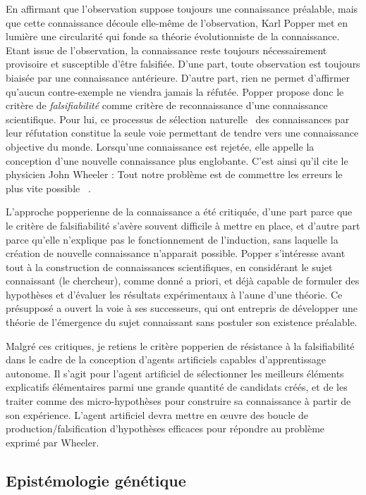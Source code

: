 \noindent
En affirmant que l'observation suppose toujours une connaissance préalable, mais que cette connaissance découle elle-même de l'observation, Karl Popper met en lumière une circularité qui fonde sa théorie évolutionniste de la connaissance. 
Etant issue de l’observation, la connaissance reste toujours nécessairement provisoire et susceptible d'être falsifiée. 
D'une part, toute observation est toujours biaisée par une connaissance antérieure. 
D'autre part, rien ne permet d’affirmer qu'aucun contre-exemple ne viendra jamais la réfutée. 
Popper propose donc le critère de \emph{falsifiabilité} comme critère de reconnaissance d'une connaissance scientifique. 
Pour lui, ce processus de \og sélection naturelle \fg\ des connaissances par leur réfutation constitue la seule voie permettant de tendre vers une connaissance objective du monde. 
Lorsqu'une connaissance est rejetée, elle appelle la conception d’une nouvelle connaissance plus englobante. 
C’est ainsi qu’il cite le physicien John Wheeler : \og Tout notre problème est de commettre les erreurs le plus vite possible \fg\ \cite{popper_connaissance_1979}.

L'approche popperienne de la connaissance a été critiquée, d'une part parce que le critère de falsifiabilité s'avère souvent difficile à mettre en place, et d'autre part parce qu'elle n'explique pas le fonctionnement de l'induction, sans laquelle la création de nouvelle connaissance n'apparait possible.
Popper s'intéresse avant tout à la construction de connaissances scientifiques, en considérant le sujet connaissant (le chercheur), comme donné a priori, et déjà capable de formuler des hypothèses et d'évaluer les résultats expérimentaux à l'aune d'une théorie. 
Ce présupposé a ouvert la voie à ses successeurs, qui ont entrepris de développer une théorie de l'émergence du sujet connaissant sans postuler son existence préalable. 

Malgré ces critiques, je retiens le critère popperien de résistance à la falsifiabilité dans le cadre de la conception d'agents artificiels capables d'apprentissage autonome.
Il s'agit pour l'agent artificiel de sélectionner les meilleurs éléments explicatifs élémentaires parmi une grande quantité de candidats créés, et de les traiter comme des micro-hypothèses pour construire sa connaissance à partir de son expérience.
L'agent artificiel devra mettre en œuvre des boucle de production/falsification d'hypothèses efficaces pour répondre au problème exprimé par Wheeler.


\subsection{Epistémologie génétique}
\label{sec:epistemologie_genetique}

